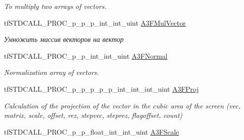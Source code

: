 \begin{DoxyCompactItemize}
\begin{DoxyCompactList}\small\item\em To multiply two arrays of vectors. \end{DoxyCompactList}\item 
\hypertarget{structs_functions_array_vector_c_p_u_a404566ead0e4615515646bf186ab1d5a}{tf\-S\-T\-D\-C\-A\-L\-L\-\_\-\-P\-R\-O\-C\-\_\-p\-\_\-p\-\_\-p\-\_\-int\-\_\-int\-\_\-uint \hyperlink{structs_functions_array_vector_c_p_u_a404566ead0e4615515646bf186ab1d5a}{A3\-F\-Mul\-Vector}}\label{structs_functions_array_vector_c_p_u_a404566ead0e4615515646bf186ab1d5a}

\begin{DoxyCompactList}\small\item\em Умножить массив векторов на вектор \end{DoxyCompactList}\item 
\hypertarget{structs_functions_array_vector_c_p_u_aa587ffce8e14d1090bb4a467f0292872}{tf\-S\-T\-D\-C\-A\-L\-L\-\_\-\-P\-R\-O\-C\-\_\-p\-\_\-p\-\_\-int\-\_\-int\-\_\-uint \hyperlink{structs_functions_array_vector_c_p_u_aa587ffce8e14d1090bb4a467f0292872}{A3\-F\-Normal}}\label{structs_functions_array_vector_c_p_u_aa587ffce8e14d1090bb4a467f0292872}

\begin{DoxyCompactList}\small\item\em Normalization array of vectors. \end{DoxyCompactList}\item 
\hypertarget{structs_functions_array_vector_c_p_u_a7449aef0f8c99bc813c3dfdabbf12f93}{tf\-S\-T\-D\-C\-A\-L\-L\-\_\-\-P\-R\-O\-C\-\_\-p\-\_\-p\-\_\-p\-\_\-p\-\_\-p\-\_\-int\-\_\-int\-\_\-int\-\_\-uint \hyperlink{structs_functions_array_vector_c_p_u_a7449aef0f8c99bc813c3dfdabbf12f93}{A3\-F\-Proj}}\label{structs_functions_array_vector_c_p_u_a7449aef0f8c99bc813c3dfdabbf12f93}

\begin{DoxyCompactList}\small\item\em Calculation of the projection of the vector in the cubic area of the screen (vec, matrix, scale, offset, rez, stepvec, steprez, flagoffset, count) \end{DoxyCompactList}\item 
\hypertarget{structs_functions_array_vector_c_p_u_a43a5e9e97a32de2036ac031c89c33b5a}{tf\-S\-T\-D\-C\-A\-L\-L\-\_\-\-P\-R\-O\-C\-\_\-p\-\_\-p\-\_\-float\-\_\-int\-\_\-int\-\_\-uint \hyperlink{structs_functions_array_vector_c_p_u_a43a5e9e97a32de2036ac031c89c33b5a}{A3\-F\-Scale}}\label{structs_functions_array_vector_c_p_u_a43a5e9e97a32de2036ac031c89c33b5a}


\end{DoxyCompactItemize}
